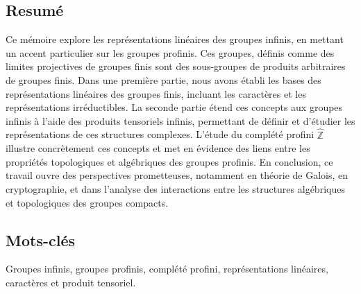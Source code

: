 \documentclass[a4paper, 14pt]{report}
\newcommand{\applyfontsize}{%
	\fontsize{12}{12}\selectfont
}
\begin{document}
\begin{onehalfspace}
\chapter*{Resumé}
{
	\applyfontsize %
Ce mémoire explore les représentations linéaires des groupes infinis, en mettant un accent particulier sur les groupes profinis. Ces groupes, définis comme des limites projectives de groupes finis sont des sous-groupes de produits arbitraires de groupes finis. Dans une première partie, nous avons établi les bases des représentations linéaires des groupes finis, incluant les caractères et les représentations irréductibles. La seconde partie étend ces concepts aux groupes infinis à l’aide des produits tensoriels infinis, permettant de définir et d’étudier les représentations de ces structures complexes. L’étude du complété profini \( \widehat{\mathbb{Z}} \) illustre concrètement ces concepts et met en évidence des liens entre les propriétés topologiques et algébriques des groupes profinis. En conclusion, ce travail ouvre des perspectives prometteuses, notamment en théorie de Galois, en cryptographie, et dans l’analyse des interactions entre les structures algébriques et topologiques des groupes compacts.
	
	
	\section*{Mots-clés}
	Groupes infinis, groupes profinis, complété profini, représentations linéaires, caractères et produit tensoriel.
	
}



\end{onehalfspace}
\end{document}
